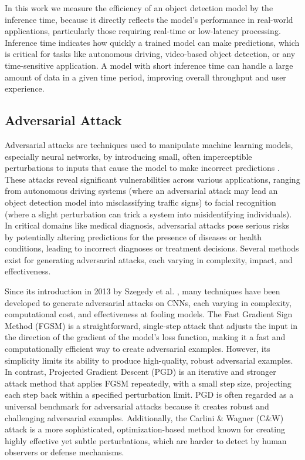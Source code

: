 \documentclass[journal,onecolumn,12pt]{IEEEtran}
\begin{document}
In this work we measure the efficiency of an object detection model by the inference time, because it directly reflects the model’s performance in real-world applications, particularly those requiring real-time or low-latency processing. Inference time indicates how quickly a trained model can make predictions, which is critical for tasks like autonomous driving, video-based object detection, or any time-sensitive application. A model with short inference time can handle a large amount of data in a given time period, improving overall throughput and user experience.

\subsection{Adversarial Attack}
Adversarial attacks are techniques used to manipulate machine learning models, especially neural networks, by introducing small, often imperceptible perturbations to inputs that cause the model to make incorrect predictions \cite{Li_2022}. These attacks reveal significant vulnerabilities across various applications, ranging from autonomous driving systems (where an adversarial attack may lead an object detection model into misclassifying traffic signs) to facial recognition (where a slight perturbation can trick a system into misidentifying individuals). In critical domains like medical diagnosis, adversarial attacks pose serious risks by potentially altering predictions for the presence of diseases or health conditions, leading to incorrect diagnoses or treatment decisions. Several methods exist for generating adversarial attacks, each varying in complexity, impact, and effectiveness. 

Since its introduction in 2013 by Szegedy et al. \cite{szegedy2014intriguingpropertiesneuralnetworks}, many techniques have been developed to generate adversarial attacks on CNNs, each varying in complexity, computational cost, and effectiveness at fooling models. The Fast Gradient Sign Method (FGSM) \cite{goodfellow2015explainingharnessingadversarialexamples} is a straightforward, single-step attack that adjusts the input in the direction of the gradient of the model's loss function, making it a fast and computationally efficient way to create adversarial examples. However, its simplicity limits its ability to produce high-quality, robust adversarial examples. In contrast, Projected Gradient Descent (PGD) \cite{madry2019deeplearningmodelsresistant} is an iterative and stronger attack method that applies FGSM repeatedly, with a small step size, projecting each step back within a specified perturbation limit. PGD is often regarded as a universal benchmark for adversarial attacks because it creates robust and challenging adversarial examples. Additionally, the Carlini \& Wagner (C\&W) \cite{carlini2017evaluatingrobustnessneuralnetworks} attack is a more sophisticated, optimization-based method known for creating highly effective yet subtle perturbations, which are harder to detect by human observers or defense mechanisms.
\end{document}
